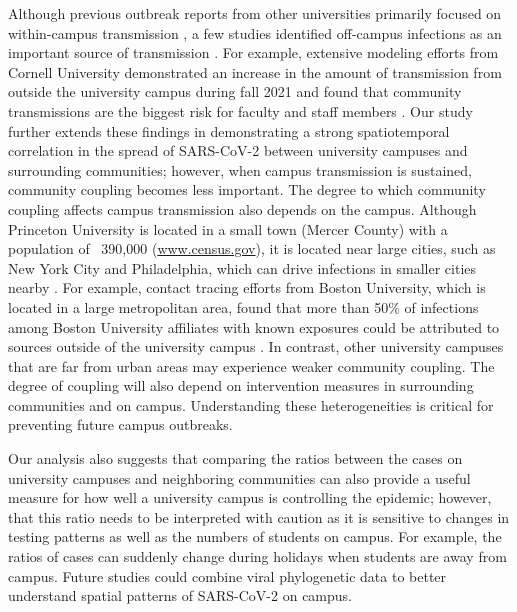 \documentclass[12pt]{article}
\begin{document}
Although previous outbreak reports from other universities primarily focused on within-campus transmission \citep{wilson2020multiple,currie2021interventions}, a few studies identified off-campus infections as an important source of transmission \citep{fox2021response,hamer2021assessment}.
For example, extensive modeling efforts from Cornell University demonstrated an increase in the amount of transmission from outside the university campus during fall 2021 and found that community transmissions are the biggest risk for faculty and staff members \citep{frazier2022modeling}.
Our study further extends these findings in demonstrating a strong spatiotemporal correlation in the spread of SARS-CoV-2 between university campuses and surrounding communities;
however, when campus transmission is sustained, community coupling becomes less important.
The degree to which community coupling affects campus transmission also depends on the campus. 
Although Princeton University is located in a small town (Mercer County) with a population of ~390,000 (\url{www.census.gov}), it is located near large cities, such as New York City and Philadelphia, which can drive infections in smaller cities nearby \citep{grenfell1997meta}.
For example, contact tracing efforts from Boston University, which is located in a large metropolitan area, found that more than 50\% of infections among Boston University affiliates with known exposures could be attributed to sources outside of the university campus \citep{hamer2021assessment}.
In contrast, other university campuses that are far from urban areas may experience weaker community coupling.
The degree of coupling will also depend on intervention measures in surrounding communities and on campus.
Understanding these heterogeneities is critical for preventing future campus outbreaks.

Our analysis also suggests that comparing the ratios between the cases on university campuses and neighboring communities can also provide a useful measure for how well a university campus is controlling the epidemic; 
however, that this ratio needs to be interpreted with caution as it is sensitive to changes in testing patterns as well as the numbers of students on campus.
For example, the ratios of cases can suddenly change during holidays when students are away from campus.
Future studies could combine viral phylogenetic data to better understand spatial patterns of SARS-CoV-2 on campus.
\end{document}

